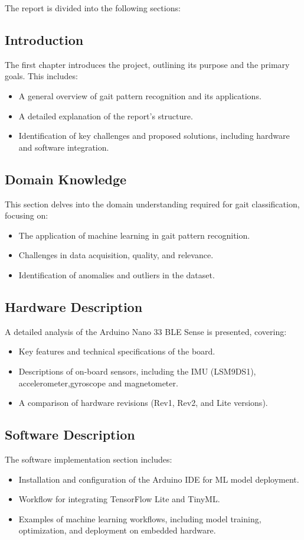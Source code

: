 The report is divided into the following sections:

\subsection*{Introduction}
The first chapter introduces the project, outlining its purpose and the primary goals. This includes:
\begin{itemize}
    \item A general overview of gait pattern recognition and its applications.
    \item A detailed explanation of the report's structure.
    \item Identification of key challenges and proposed solutions, including hardware and software integration.
\end{itemize}

\subsection*{Domain Knowledge}
This section delves into the domain understanding required for gait classification, focusing on:
\begin{itemize}
    \item The application of machine learning in gait pattern recognition.
    \item Challenges in data acquisition, quality, and relevance.
    \item Identification of anomalies and outliers in the dataset.
\end{itemize}

\subsection*{Hardware Description}
A detailed analysis of the Arduino Nano 33 BLE Sense  is presented, covering:
\begin{itemize}
    \item Key features and technical specifications of the board.
    \item Descriptions of on-board sensors, including the IMU (LSM9DS1), accelerometer,gyroscope and magnetometer.
    \item A comparison of hardware revisions (Rev1, Rev2, and Lite versions).
\end{itemize}

\subsection*{Software Description}
The software implementation section includes:
\begin{itemize}
    \item Installation and configuration of the Arduino IDE for ML model deployment.
    \item Workflow for integrating TensorFlow Lite and TinyML.
    \item Examples of machine learning workflows, including model training, optimization, and deployment on embedded hardware.
\end{itemize}


